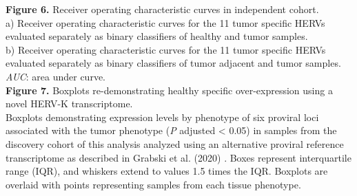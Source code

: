 \textbf{Figure 6.} Receiver operating characteristic curves in independent cohort. \\
a) Receiver operating characteristic curves for the 11 tumor specific HERVs evaluated separately as binary classifiers of healthy and tumor samples. \\
b) Receiver operating characteristic curves for the 11 tumor specific HERVs evaluated separately as binary classifiers of tumor adjacent and tumor samples. \\
\emph{AUC}: area under curve. \\

\textbf{Figure 7.} Boxplots re-demonstrating healthy specific over-expression using a novel HERV-K transcriptome. \\
Boxplots demonstrating expression levels by phenotype of six proviral loci associated with the tumor phenotype (\emph{P} adjusted < 0.05) in samples from the discovery cohort of this analysis analyzed using an alternative proviral reference transcriptome as described in Grabski et al. (2020) \citep{Grabski2020}.
Boxes represent interquartile range (IQR), and whiskers extend to values 1.5 times the IQR.
Boxplots are overlaid with points representing samples from each tissue phenotype. \\
